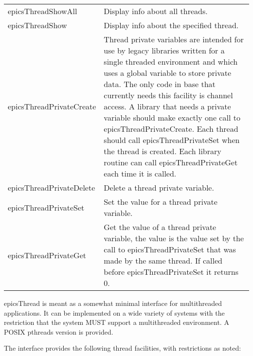 \begin{center}
\begin{longtable}{p{2.375in}p{4.0in}}
epicsThreadShowAll & Display info about all threads.\\
epicsThreadShow & Display info about the specified thread.\\
epicsThreadPrivateCreate & Thread private variables are intended for use by legacy libraries written for a single threaded environment and which uses a global variable to store private data. The only code in base that currently needs this facility is channel access. A library that needs a private variable should make exactly one call to epicsThreadPrivateCreate. Each thread should call epicsThreadPrivateSet when the thread is created. Each library routine can call epicsThreadPrivateGet each time it is called.\\
epicsThreadPrivateDelete & Delete a thread private variable.\\
epicsThreadPrivateSet & Set the value for a thread private variable. \\
epicsThreadPrivateGet & Get the value of a thread private variable, the value is the value set by the call to epicsThreadPrivateSet that was made by the same thread. If called before epicsThreadPrivateSet it returns 0.
\end{longtable}

\end{center}


epicsThread is meant as a somewhat minimal interface for multithreaded applications. It can be implemented on a wide 
variety of systems with the restriction that the system MUST support a multithreaded environment. A POSIX pthreads 
version is provided.

The interface provides the following thread facilities, with restrictions as noted:

